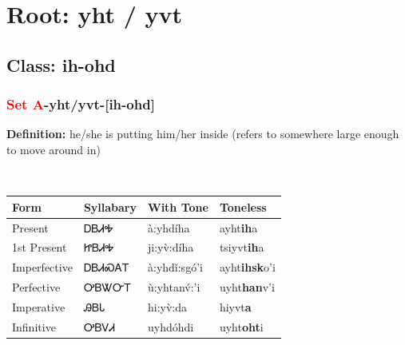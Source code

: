 \needspace{4in}
\section*{Root: yht / yvt}
\nopagebreak
{}
\needspace{3in}
\subsection*{Class: ih-ohd}
\nopagebreak
\needspace{2in}
\subsubsection*{\textcolor{Red}{Set A}{-}\textbf{yht/yvt}{-}[ih-ohd]}
\nopagebreak
\textbf{Definition: } he/she is putting him/her inside (refers to somewhere large enough to move around in)
\\[0.5em]
\begin{tabularx}{\textwidth}{l X X X}%
\toprule%
\textbf{Form}&\textbf{Syllabary}&\textbf{With Tone}&\textbf{Toneless}\\%
\midrule%
Present&ᎠᏴᏗᎭ&à:yhdíha&ayht\textbf{ih}a\\%
1st Present&ᏥᏴᏗᎭ&ji:yv̀:díha&tsiyvt\textbf{ih}a\\%
Imperfective&ᎠᏴᏗᏍᎪᎢ&à:yhdǐ:sgó’i&ayht\textbf{ihsk}o'i\\%
Perfective&ᎤᏴᏔᏅᎢ&ù:yhtanv́:’i&uyht\textbf{han}v'i\\%
Imperative&ᎯᏴᏓ&hi:yv̀:da&hiyvt\textbf{a}\\%
Infinitive&ᎤᏴᏙᏗ&uyhdóhdi&uyht\textbf{oht}i\\%
\bottomrule%
\end{tabularx}
\\[1em]